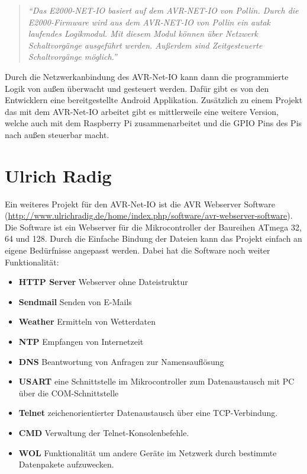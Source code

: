 \begin{quote}
	\textit{
		\enquote{Das E2000-NET-IO basiert auf dem AVR-NET-IO von Pollin. Durch die
		E2000-Firmware wird aus dem AVR-NET-IO von Pollin ein autak laufendes
		Logikmodul. Mit diesem Modul können über Netzwerk Schaltvorgänge ausgeführt
		werden. Außerdem sind Zeitgesteuerte Schaltvorgänge möglich.} }
	\cite{elektronik2000}
\end{quote}

Durch die Netzwerkanbindung des AVR-Net-IO kann dann die programmierte Logik von
außen überwacht und gesteuert werden. Dafür gibt es von den Entwicklern eine
bereitgestellte Android Applikation. Zusätzlich zu einem Projekt das mit dem
AVR-Net-IO arbeitet gibt es mittlerweile eine weitere Version, welche auch mit dem
Raspberry Pi zusammenarbeitet und die GPIO Pins des Pis nach außen steuerbar
macht.

\section{Ulrich Radig}

Ein weiteres Projekt für den AVR-Net-IO ist die AVR Webserver Software
(\url{http://www.ulrichradig.de/home/index.php/software/avr-webserver-software}).
Die Software ist ein Webserver für die Mikrocontroller der Baureihen ATmega 32,
64 und 128. Durch die Einfache Bindung der Dateien kann das Projekt
einfach an eigene Bedürfnisse angepasst werden. Dabei hat die Software noch
weiter Funktionalität:

\begin{itemize}
  \item \textbf{\ac{HTTP} Server} Webserver ohne Dateistruktur
  \item \textbf{Sendmail} Senden von E-Mails
  \item \textbf{Weather} Ermitteln von Wetterdaten
  \item \textbf{\ac{NTP}} Empfangen von Internetzeit
  \item \textbf{\ac{DNS}} Beantwortung von Anfragen zur
  Namensauflösung
  \item \textbf{\ac{USART}} eine Schnittstelle im Mikrocontroller zum
  Datenaustausch mit PC über die COM-Schnittstelle
  \item \textbf{\ac{Telnet}} zeichenorientierter
  Datenaustausch über eine TCP-Verbindung.
  \item \textbf{\ac{CMD}} Verwaltung der Telnet-Konsolenbefehle.
  \item \textbf{\ac{WOL}} Funktionalität um andere Geräte im Netzwerk
  durch bestimmte Datenpakete aufzuwecken.
\end{itemize}
